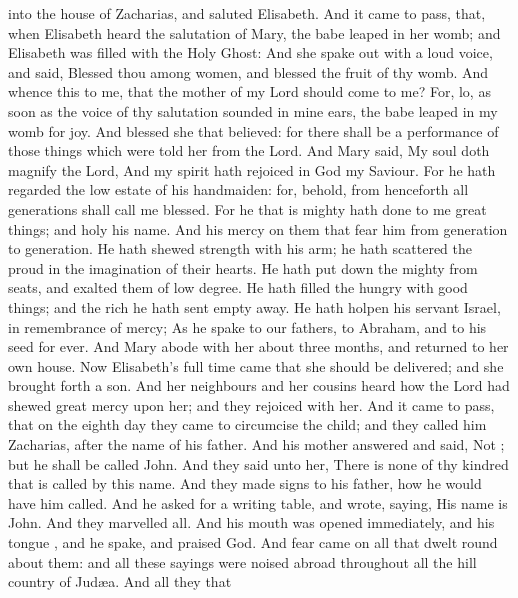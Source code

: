 {into the
house of
Zacharias,
and
saluted
Elisabeth.
And it came to
pass, that,
when
Elisabeth
heard the
salutation of
Mary, the
babe
leaped
in
her
womb;
and
Elisabeth was
filled with
the
Holy
Ghost:
And she spake
out with
a
loud
voice,
and
said,
Blessed
{}
thou
among
women,
and
blessed
{} the
fruit
of
thy
womb.
And
whence
{}
this to
me,
that the
mother
of
my
Lord should
come
to
me?
For,
lo, as soon
as the
voice
of
thy
salutation
sounded
in
mine
ears, the
babe
leaped
in
my
womb
for
joy.
And
blessed
{} she that
believed:
for there shall
be a
performance of those things which were
told
her
from the
Lord.
And
Mary
said,
My
soul doth
magnify the
Lord,
And
my
spirit hath
rejoiced
in
God
my
Saviour.
For he hath
regarded the low
estate
of
his
handmaiden:
for,
behold,
from
henceforth
all
generations shall
call
me
blessed.
For he that is
mighty hath
done to
me great
things;
and
holy
{}
his
name.
And
his
mercy
{} on them that
fear
him
from
generation to
generation.
He hath
shewed
strength
with
his
arm; he hath
scattered the
proud in the
imagination
of
their
hearts.
He hath put
down the
mighty
from
{}
seats,
and
exalted them of low
degree.
He hath
filled the
hungry with good
things;
and the
rich he hath
sent
empty
away.
He hath
holpen
his
servant
Israel, in
remembrance
of
{}
mercy;
As he
spake
to
our
fathers, to
Abraham,
and
to
his
seed
for
ever.
And
Mary
abode
with
her
about
three
months,
and
returned
to her
own
house.
Now
Elisabeth’s
full
time
came that
she should be
delivered;
and she brought
forth a
son.
And
her
neighbours
and
her
cousins
heard
how the
Lord had shewed
great
mercy
upon
her;
and they
rejoiced with
her.
And it came to pass,
that
on the
eighth
day they
came to
circumcise the
child;
and they
called
him
Zacharias,
after the
name
of
his
father.
And
his
mother
answered and
said,
Not
{};
but he shall be
called
John.
And they
said
unto
her, There
is
none
of
thy
kindred
that is
called
by
this
name.
And they made
signs
to
his
father,
how he would
have
him
called.
And he
asked for a writing
table, and
wrote,
saying,
His
name
is
John.
And they
marvelled
all.
And
his
mouth was
opened
immediately,
and
his
tongue
{},
and he
spake, and
praised
God.
And
fear
came
on
all that dwelt round
about
them:
and
all
these
sayings were noised
abroad
throughout
all the hill
country of
Judæa.
And
all they that
}
